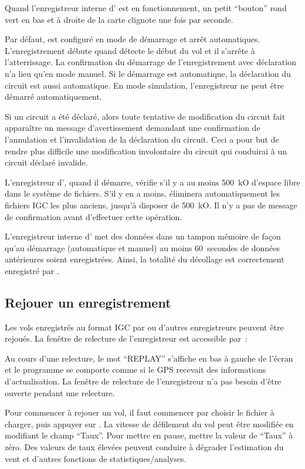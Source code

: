Quand l'enregistreur interne d'\xc{} est en fonctionnement, un petit ``bouton'' rond vert en 
bas et à droite de la carte clignote une fois par seconde.

Par défaut, \xc{} est configuré en mode de démarrage et arrêt automatiques.
L'enregistrement débute quand \xc{} détecte le début du vol et il s'arrête à l'atterrissage. La confirmation du démarrage
de l'enregistrement avec déclaration n'a lieu qu'en mode manuel. Si
le démarrage est automatique, la déclaration du circuit est aussi automatique.
En mode simulation, l'enregistreur ne peut être démarré automatiquement.

Si un circuit a été déclaré, alors toute tentative de modification du
circuit fait apparaître un message d'avertissement demandant une confirmation
de l'annulation et l'invalidation de la déclaration du circuit. Ceci a pour but de
rendre plus difficile une modification involontaire du circuit qui conduirai à un circuit
déclaré invalide.

L'enregistreur d'\xc, quand il démarre, vérifie s’il y a au moins 500~kO d'espace
libre dans le système de fichiers. S'il y en a moins, \xc{} éliminera
automatiquement les fichiers IGC les plus anciens, jusqu'à disposer de 500~kO. Il n'y a pas de message de confirmation avant d'effectuer cette opération. \warning{}

L'enregistreur interne d'\xc{} met des données dans un tampon mémoire de façon qu'au démarrage
(automatique et manuel) au moins 60~secondes de données antérieures soient enregistrées. Ainsi, la totalité du décollage est correctement
enregistré par \xc. 

\subsection*{Rejouer un enregistrement}\label{sec:logger-replay}
Les vols enregistrés au format IGC par \xc{} ou d'autres enregistreurs peuvent être rejoués. La fenêtre de relecture de l'enregistreur
est accessible par~:
\begin{quote}
\blink{}
\end{quote}

Au cours d'une relecture, le mot ``REPLAY'' s'affiche en bas à gauche de
l'écran et le programme se comporte comme si le GPS  recevait des informations
d'actualisation. La fenêtre de relecture de l'enregistreur n'a pas besoin d'être
ouverte pendant une relecture.

Pour commencer à rejouer un vol, il faut commencer par choisir le fichier à charger, puis appuyer sur
. La vitesse de défilement du vol peut être modifiée en
modifiant le champ ``Taux''. Pour mettre en pause,
mettre la valeur de ``Taux'' à zéro. Des valeurs de taux élevées peuvent conduire à  dégrader
l'estimation du vent et d'autres fonctions de statistiques/analyses.

